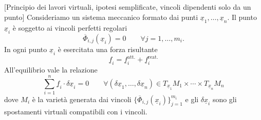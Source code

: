 \begin{theorem}{}[Principio dei lavori virtuali, ipotesi semplificate, vincoli dipendenti solo da un punto]
Consideriamo un sistema meccanico formato dai punti \(\underline{x}_1,\ldots,\underline{x}_n\). Il punto \(\underline{x}_i\) è soggetto ai vincoli perfetti regolari
\[
\overline{\Phi}_{i,j}(\underline{x}_i)=0
\qquad
\forall j=1,\ldots,m_i.
\]
In ogni punto \(\underline{x}_i\) è esercitata una forza risultante
\[
\underline{f}_i=\underline{f}_i^{\mathrm{att.}}+\underline{f}_i^{\mathrm{reat.}}
\]
All'equilibrio vale la relazione
\[
\sum_{i=1}^{n}\underline{f}_i\cdot \delta \underline{x}_i=0
\qquad
\forall (\delta \underline{x}_1,\ldots,\delta \underline{x}_n)\in T_{\underline{x}_1}M_1\times\cdots\times T_{\underline{x}_n}M_n
\]
dove \(M_i\) è la varietà generata dai vincoli \(\{\overline{\Phi}_{i,j}(\underline{x}_i)\}_{j=1}^{m_i}\) e gli \(\delta \underline{x}_i\) sono gli spostamenti virtuali compatibili con i vincoli.
\end{theorem}

